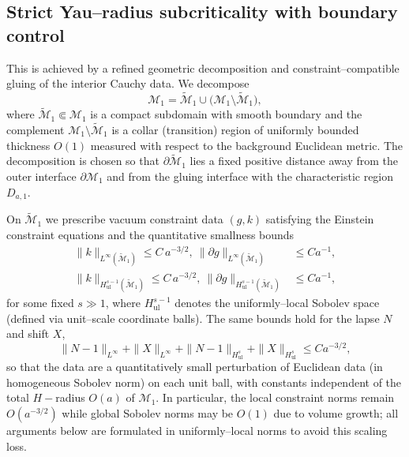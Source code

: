 \documentclass{amsart}
\begin{document}
{\subsection{Strict Yau–radius subcriticality with boundary control}
This is achieved by a refined geometric decomposition and constraint–compatible gluing of the interior Cauchy data. We decompose
\[
\mathcal M_{1}=\widetilde{\mathcal M}_{1}\cup\Big(\mathcal M_{1}\setminus\widetilde{\mathcal M}_{1}\Big),
\]
where $\widetilde{\mathcal M}_{1}\Subset\mathcal M_{1}$ is a compact subdomain with smooth boundary and the complement 
$\mathcal M_{1}\setminus\widetilde{\mathcal M}_{1}$ is a collar (transition) region of uniformly bounded thickness $O(1)$ measured with respect to the background Euclidean metric. The decomposition is chosen so that
$\partial\widetilde{\mathcal M}_{1}$ lies a fixed positive distance away from the outer interface $\partial\mathcal M_{1}$ and from the gluing interface with the characteristic region $D_{a,1}$.

\noindent On $\widetilde{\mathcal M}_{1}$ we prescribe vacuum constraint data $(g,k)$ satisfying the Einstein constraint equations and the quantitative smallness bounds
\begin{align}
\|k\|_{L^\infty(\widetilde{\mathcal M}_{1})}
\leq C\,a^{-3/2},~
\|\partial g\|_{L^\infty(\widetilde{\mathcal M}_{1})}
&\le C a^{-1}, 
\label{eq:int-Linf}\\
\|k\|_{H^{s-1}_{\mathrm{ul}}(\widetilde{\mathcal M}_{1})}
\leq C\,a^{-3/2},~
\|\partial g\|_{H^{s-1}_{\mathrm{ul}}(\widetilde{\mathcal M}_{1})}
&\le C a^{-1},
\label{eq:int-Sob}
\end{align}
for some fixed $s\gg1$, where $H^{s-1}_{\mathrm{ul}}$ denotes the uniformly–local Sobolev space (defined via unit–scale coordinate balls). The same bounds hold for the lapse $N$ and shift $X$,
\begin{equation}
\|N-1\|_{L^\infty}+\|X\|_{L^\infty}
+\|N-1\|_{H^{s}_{\mathrm{ul}}}+\|X\|_{H^{s}_{\mathrm{ul}}}
\le C a^{-3/2},
\end{equation}
so that the data are a quantitatively small perturbation of Euclidean data (in homogeneous Sobolev norm) on each unit ball, with constants independent of the total $H-$radius $O(a)$ of $\mathcal M_{1}$. In particular, the local constraint norms remain $O(a^{-3/2})$ while global Sobolev norms may be $O(1)$ due to volume growth; all arguments below are formulated in uniformly–local norms to avoid this scaling loss.

}
\end{document}
